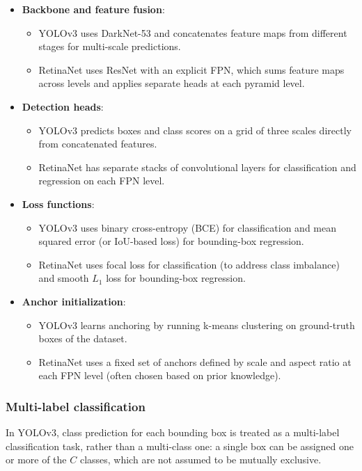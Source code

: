 \begin{itemize}
  \item \textbf{Backbone and feature fusion}:
    \begin{itemize}
      \item YOLOv3 uses DarkNet-53 and concatenates feature maps from different stages for multi-scale predictions.
      \item RetinaNet uses ResNet with an explicit FPN, which sums feature maps across levels and applies separate heads at each pyramid level.
    \end{itemize}
  \item \textbf{Detection heads}:
    \begin{itemize}
      \item YOLOv3 predicts boxes and class scores on a grid of three scales directly from concatenated features.
      \item RetinaNet has separate stacks of convolutional layers for classification and regression on each FPN level.
    \end{itemize}
  \item \textbf{Loss functions}:
    \begin{itemize}
      \item YOLOv3 uses binary cross-entropy (BCE) for classification and mean squared error (or IoU-based loss) for bounding-box regression.
      \item RetinaNet uses focal loss for classification (to address class imbalance) and smooth $L_1$ loss for bounding-box regression.
    \end{itemize}
  \item \textbf{Anchor initialization}:
    \begin{itemize}
      \item YOLOv3 learns anchoring by running k-means clustering on ground-truth boxes of the dataset.
      \item RetinaNet uses a fixed set of anchors defined by scale and aspect ratio at each FPN level (often chosen based on prior knowledge).
    \end{itemize}
\end{itemize}

\subsubsection{Multi-label classification}

In YOLOv3, class prediction for each bounding box is treated as a multi-label classification task, rather than a multi-class one: a single box can be assigned one or more of the $C$ classes, which are not assumed to be mutually exclusive.


